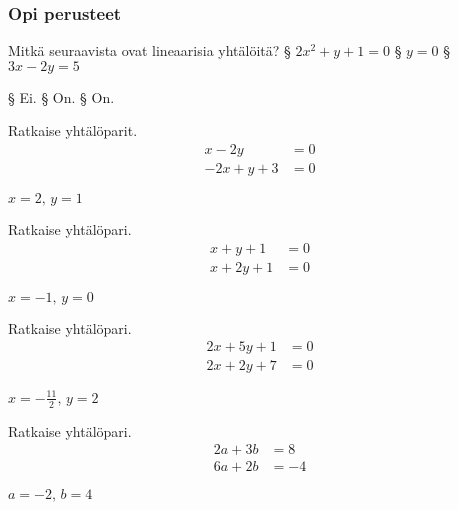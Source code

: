 \begin{tehtavasivu}

\subsubsection*{Opi perusteet}

\begin{tehtava}
  Mitkä seuraavista ovat lineaarisia yhtälöitä?
  \alakohdat
    § $2x^2 + y +1 = 0$
    § $y = 0$
    § $3x - 2y = 5$
  \loppu
  \begin{vastaus}
    \alakohdat
      § Ei.
      § On.
      § On.
    \loppu
  \end{vastaus}
\end{tehtava}

\begin{tehtava}
    Ratkaise yhtälöparit.
    \begin{align*}
        x-2y &= 0 \\
        -2x+y+3 &=0
    \end{align*}
    \begin{vastaus}
        $x = 2, \, y = 1$
    \end{vastaus}
\end{tehtava}

\begin{tehtava}
    Ratkaise yhtälöpari.
    \begin{align*}
        x+y+1 &= 0 \\
        x+2y+1 &=0
    \end{align*}
    \begin{vastaus}
        $x = -1, \, y = 0$
    \end{vastaus}
\end{tehtava}

\begin{tehtava}
    Ratkaise yhtälöpari.
    \begin{align*}
        2x+5y+1 &= 0 \\
        2x+2y+7 &=0
    \end{align*}
    \begin{vastaus}
        $x = -\frac{11}{2}, \, y = 2$
    \end{vastaus}
\end{tehtava}

\begin{tehtava}
    Ratkaise yhtälöpari.
    \begin{align*}
        2a+3b &= 8 \\
        6a+2b &= -4
    \end{align*}
    \begin{vastaus}
        $a = -2, \, b = 4$
    \end{vastaus}
\end{tehtava}


\end{tehtavasivu}
